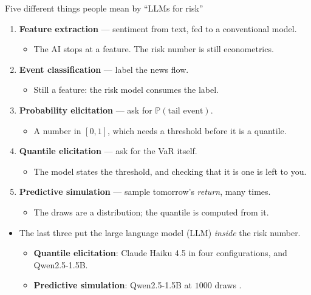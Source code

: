 \documentclass[9pt, aspectratio=169, t]{beamer}
\providecommand{\Prob}{\mathbb{P}}
\begin{document}
\begin{frame}{Five different things people mean by ``LLMs for risk''}
  \begin{enumerate}
    \item \textbf{Feature extraction} --- sentiment from text, fed to a conventional
          model.
      \begin{itemize}
        \item The AI stops at a feature. The risk number is still econometrics.
      \end{itemize}
    \item \textbf{Event classification} --- label the news flow.
      \begin{itemize}
        \item Still a feature: the risk model consumes the label.
      \end{itemize}
    \item \textbf{Probability elicitation} --- ask for $\Prob(\text{tail event})$.
      \begin{itemize}
        \item A number in $[0,1]$, which needs a threshold before it is a quantile.
      \end{itemize}
    \item \textbf{Quantile elicitation} --- ask for the VaR itself.
      \begin{itemize}
        \item The model states the threshold, and checking that it is one is left to you.
      \end{itemize}
    \item \textbf{Predictive simulation} --- sample tomorrow's \emph{return}, many times.
      \begin{itemize}
        \item The draws are a distribution; the quantile is computed from it.
      \end{itemize}
  \end{enumerate}
  \vspace{0.7em}
  \begin{block}{}
    \begin{itemize}
      \item The last three put the large language model (LLM) \emph{inside} the risk
            number.
        \begin{itemize}
          \item \textbf{Quantile elicitation}: Claude Haiku 4.5 in four
                configurations, and Qwen2.5-1.5B.
          \item \textbf{Predictive simulation}: Qwen2.5-1.5B at $1000$ draws
                \parencite{pele2026llmvar}.
        \end{itemize}
    \end{itemize}
  \end{block}
\end{frame}
\end{document}
